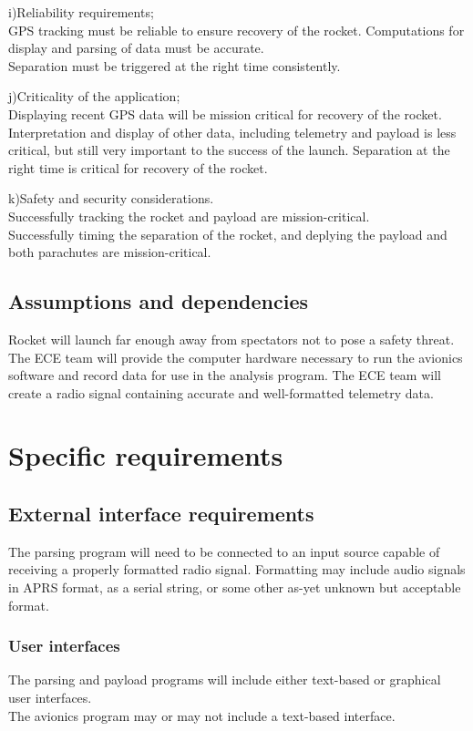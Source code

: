 \documentclass[onecolumn, draftclsnofoot, 10pt, compsoc]{IEEEtran}
\begin{document}
i)Reliability requirements;\\
GPS tracking must be reliable to ensure recovery of the rocket. Computations for display and parsing of data must be accurate.\\
Separation must be triggered at the right time consistently.

j)Criticality of the application;\\
Displaying recent GPS data will be mission critical for recovery of the rocket. Interpretation and display of other data, including telemetry and payload is less critical, but still very important to the success of the launch. Separation at the right time is critical for recovery of the rocket.

k)Safety and security considerations.\\
Successfully tracking the rocket and payload are mission-critical.\\
Successfully timing the separation of the rocket, and deplying the payload and both parachutes are mission-critical.

\subsection{Assumptions and dependencies}
Rocket will launch far enough away from spectators not to pose a safety threat.
The ECE team will provide the computer hardware necessary to run the avionics software and record data for use in the analysis program.
The ECE team will create a radio signal containing accurate and well-formatted telemetry data.

\section{Specific requirements}
\subsection{External interface requirements}
The parsing program will need to be connected to an input source capable of receiving a properly formatted radio signal.  Formatting may include audio signals in APRS format, as a serial string, or some other as-yet unknown but acceptable format.

\subsubsection{User interfaces}
The parsing and payload programs will include either text-based or graphical user interfaces.\\
The avionics program may or may not include a text-based interface.
\end{document}
